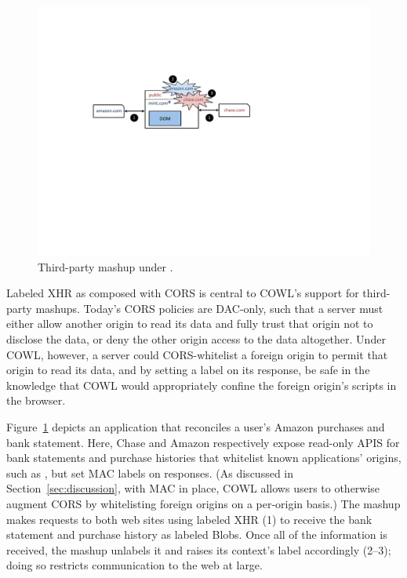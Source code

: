 \begin{figure}
\centerline{\includegraphics[width=\columnwidth]{mashup}}
\caption{\label{fig:mashup} Third-party mashup under \sys{}.}
\end{figure}
Labeled XHR as composed with CORS is central to COWL's support for
third-party mashups.
%
Today's CORS policies are DAC-only, such that a server must either
allow another origin to read its data and fully trust that origin not
to disclose the data, or deny the other origin access to the data
altogether. Under COWL, however, a server could CORS-whitelist a
foreign origin to permit that origin to read its data, and by setting
a label on its response, be safe in the knowledge that COWL would
appropriately confine the foreign origin's scripts in the browser.
 
Figure~\ref{fig:mashup} depicts an application that reconciles a
user's Amazon purchases and bank statement.
%
Here, Chase and Amazon respectively expose read-only APIS for bank
statements and purchase histories that whitelist known applications'
origins, such as , but set MAC labels on responses.
%
(As discussed in Section~\ref{sec:discussion}, with MAC in place, COWL
allows users to otherwise augment CORS by whitelisting foreign origins
on a per-origin basis.)
%
%
The mashup makes requests to both web sites using labeled XHR (1)
to receive the bank statement and
purchase history as labeled Blobs.
%
Once all of the information is received, the mashup unlabels it and
raises its context's label accordingly (2--3); doing so restricts
communication to the web at large.

